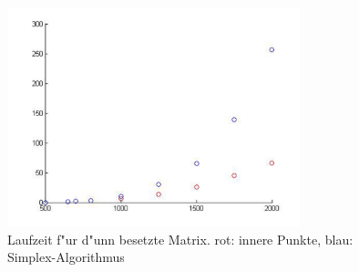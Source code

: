 \begin{refsection}
\begin{figure}
\begin{center}
  \includegraphics[width=8.5cm]{./innerepunkte/duennbesetztematrix.pdf}
\end{center}
\caption{Laufzeit f"ur d"unn besetzte Matrix.
{\color{red}rot}: innere Punkte, {\color{blue} blau}: Simplex-Algorithmus
\label{innerpunkte:performance-duennbesetzt}}
\end{figure}





\end{refsection}
